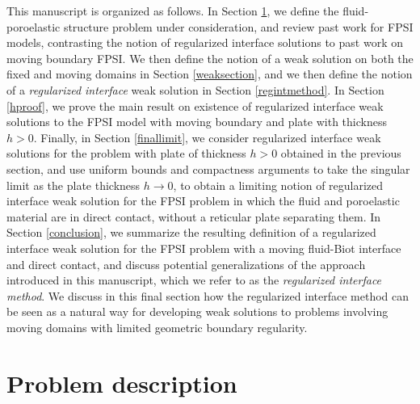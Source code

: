 \documentclass[11pt]{article}
\theoremstyle{definition}
\begin{document}
This manuscript is organized as follows. In Section \ref{problemdef}, we define the fluid-poroelastic structure problem under consideration, and review past work for FPSI models, contrasting the notion of regularized interface solutions to past work on moving boundary FPSI. We then define the notion of a weak solution on both the fixed and moving domains in Section \ref{weaksection}, and we then define the notion of a \textit{regularized interface} weak solution in Section \ref{regintmethod}. In Section \ref{hproof}, we prove the main result on existence of regularized interface weak solutions to the FPSI model with moving boundary and plate with thickness $h > 0$. Finally, in Section \ref{finallimit}, we consider regularized interface weak solutions for the problem with plate of thickness $h > 0$ obtained in the previous section, and use uniform bounds and compactness arguments to take the singular limit as the plate thickness $h \to 0$, to obtain a limiting notion of regularized interface weak solution for the FPSI problem in which the fluid and poroelastic material are in direct contact, without a reticular plate separating them. In Section \ref{conclusion}, we summarize the resulting definition of a regularized interface weak solution for the FPSI problem with a moving fluid-Biot interface and direct contact, and discuss potential generalizations of the approach introduced in this manuscript, which we refer to as the \textit{regularized interface method}. We discuss in this final section how the regularized interface method can be seen as a natural way for developing weak solutions to problems involving moving domains with limited geometric boundary regularity.
\fi

\section{Problem description}\label{problemdef}
\end{document}
